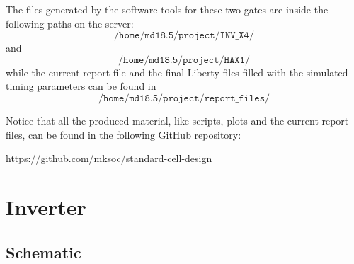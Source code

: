\documentclass[a4paper]{article}
\begin{document}
The files generated by the software tools for these two gates are inside the following paths on the server:
\begin{equation*}
	\texttt{/home/md18.5/project/INV\_X4/}
\end{equation*}
and
\begin{equation*}
	\texttt{/home/md18.5/project/HAX1/}
\end{equation*}
while the current report file and the final Liberty files filled with the simulated timing parameters can be found in
\begin{equation*}
	\texttt{/home/md18.5/project/report\_files/}
\end{equation*}

Notice that all the produced material, like scripts, plots and the current report files, can be found in the following GitHub repository:
\begin{center}
	\url{https://github.com/mksoc/standard-cell-design}
\end{center}

\newpage
\section{Inverter}

\subsection{Schematic}
\end{document}
